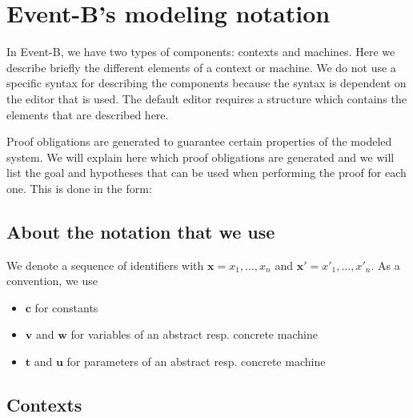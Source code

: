 \newcommand{\varlist}[1]{\mathbf{#1}}
\newcommand{\allconstants}{\varlist{c}}
\newcommand{\absvariables}{\varlist{v}}
\newcommand{\concvariables}{\varlist{w}}
\newcommand{\allvariables}{{\absvariables,\concvariables}}
\newcommand{\absparameters}{\varlist{t}}
\newcommand{\concparameters}{\varlist{u}}
\newcommand{\allparameters}{{\absparameters,\concparameters}}
\newcommand{\absbeforeafter}{\mathcal{S}}
\newcommand{\concbeforeafter}{\mathcal{T}}

\section{Event-B's modeling notation}
\label{modeling_notation}

In Event-B, we have two types of components: contexts and machines.
Here we describe briefly the different elements of a context or machine.
We do not use a specific syntax for describing the components because the syntax is dependent on the editor that is
used. The default editor requires a structure which contains the elements that are described here.

Proof obligations are generated to guarantee certain properties of the modeled system.
We will explain here which proof obligations are generated and we will list the goal and hypotheses that can be used
when performing the proof for each one.
This is done in the form:

\subsection{About the notation that we use}
\label{about_the_notation}

We denote a sequence of identifiers with $\varlist{x} = x_1,\ldots,x_n$ and $\varlist{x}' = x'_1,\ldots,x'_n$.
As a convention, we use
\begin{itemize}
\item $\allconstants$ for constants
\item $\absvariables$ and $\concvariables$ for variables of an abstract resp. concrete machine
\item $\absparameters$ and $\concparameters$ for parameters of an abstract resp. concrete machine
\end{itemize}

\subsection{Contexts}
\label{context}

